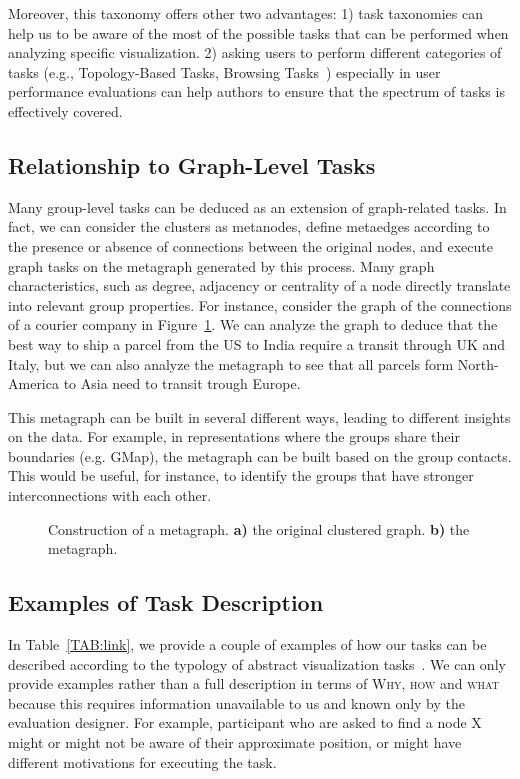 \documentclass{article}
\newcommand{\Bold}[1]{\textbf{#1}}
\begin{document}
Moreover, this taxonomy offers other two advantages: 1) task taxonomies can help us to be aware of the most of the possible tasks that can be performed when analyzing specific visualization. 2) asking users to perform different categories of tasks (e.g., Topology-Based Tasks, Browsing Tasks~\cite{IV_BL}) especially in user performance evaluations can help authors to ensure that the spectrum of tasks is effectively covered.


\subsection{Relationship to Graph-Level Tasks}
Many group-level tasks can be deduced as an extension of graph-related tasks. In fact, we can consider the clusters as metanodes, define metaedges according to the presence or absence of connections between the original nodes, and execute graph tasks on the metagraph generated by this process. Many graph characteristics, such as degree, adjacency or centrality of a node directly translate into relevant group properties. For instance, consider the graph of the connections of a courier company in Figure~\ref{FIG:metagraph}. We can analyze the graph to deduce that the best way to ship a parcel from the US to India require a transit through UK and Italy, but we can also analyze the metagraph to see that all parcels form North-America to Asia need to transit trough Europe.

This metagraph can be built in several different ways, leading to different insights on the data. For example, in representations where the groups share their boundaries (e.g. GMap), the metagraph can be built based on the group contacts. This would be useful, for instance, to identify the groups that have stronger interconnections with each other.

\begin{figure}[t]
\centering \hfill
{} \hfill
{} \hfill
\caption{Construction of a metagraph. \textbf{a)} the original clustered graph. \Bold{b)} the metagraph. }
\label{FIG:metagraph}
\end{figure}

\subsection{Examples of Task Description}
In Table~\ref{TAB:link}, we provide a couple of examples of how our tasks can be described according to the typology of abstract visualization tasks~\cite{IV_Brehmer}. We can only provide examples rather than a full description in terms of \textsc{Why, how} and \textsc{what} because this requires information unavailable to us and known only by the evaluation designer. For example, participant who are asked to find a node X might or might not be aware of their approximate position, or might have different motivations for executing the task.
\end{document}
